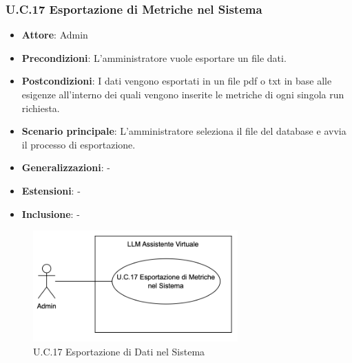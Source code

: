 \subsubsection{U.C.17 Esportazione di Metriche nel Sistema} 
\begin{itemize}
    \item \textbf{Attore}: Admin
    \item \textbf{Precondizioni}: L’amministratore vuole esportare un file dati.
    \item \textbf{Postcondizioni}: I dati vengono esportati in un file pdf o txt in base alle esigenze all'interno dei quali vengono inserite le metriche di ogni singola run richiesta.
    \item \textbf{Scenario principale}: L'amministratore seleziona il file del database e avvia il processo di esportazione.
    \item \textbf{Generalizzazioni}: -
    \item \textbf{Estensioni}: -
    \item \textbf{Inclusione}: -
\end{itemize}
\begin{figure}[H]
    \centering
    \includegraphics[width=0.7\textwidth]{img/UC17.png}
    \caption{U.C.17 Esportazione di Dati nel Sistema}
\end{figure}
\newpage

